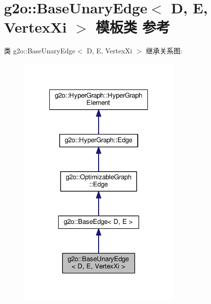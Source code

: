 \hypertarget{classg2o_1_1BaseUnaryEdge}{\section{g2o\-:\-:Base\-Unary\-Edge$<$ D, E, Vertex\-Xi $>$ 模板类 参考}
\label{classg2o_1_1BaseUnaryEdge}
}


类 g2o\-:\-:Base\-Unary\-Edge$<$ D, E, Vertex\-Xi $>$ 继承关系图\-:
\nopagebreak
\begin{figure}[H]
\begin{center}
\leavevmode
\includegraphics[width=228pt]{classg2o_1_1BaseUnaryEdge__inherit__graph}
\end{center}
\end{figure}


